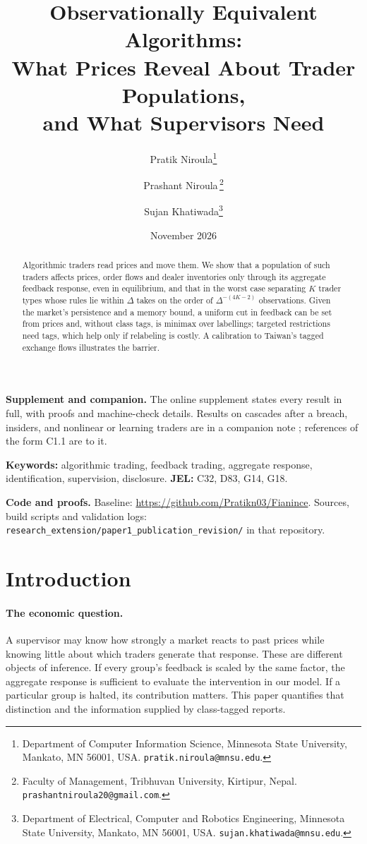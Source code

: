 \documentclass[12pt]{article}
\title{Observationally Equivalent Algorithms:\\ What Prices Reveal About Trader Populations,\\ and What Supervisors Need}
\author{Pratik Niroula\thanks{Department of Computer Information Science, Minnesota State University, Mankato, MN 56001, USA. \texttt{pratik.niroula@mnsu.edu}.}
\and Prashant Niroula\,\thanks{Faculty of Management, Tribhuvan University, Kirtipur, Nepal. \texttt{prashantniroula20@gmail.com}.}
\and Sujan Khatiwada\thanks{Department of Electrical, Computer and Robotics Engineering, Minnesota State University, Mankato, MN 56001, USA. \texttt{sujan.khatiwada@mnsu.edu}.}}
\date{November 2026}
\theoremstyle{definition}
\theoremstyle{remark}
\begin{document}
\maketitle
\thispagestyle{empty}\pagestyle{empty}
\begingroup\singlespacing\small

\begin{abstract}
\noindent Algorithmic traders read prices and move them. We show that a population of such traders affects prices, order flows and dealer inventories only through its aggregate feedback response, even in equilibrium, and that in the worst case separating $K$ trader types whose rules lie within $\Delta$ takes on the order of $\Delta^{-(4K-2)}$ observations. Given the market's persistence and a memory bound, a uniform cut in feedback can be set from prices and, without class tags, is minimax over labellings; targeted restrictions need tags, which help only if relabeling is costly. A calibration to Taiwan's tagged exchange flows illustrates the barrier.
\end{abstract}

\noindent\textbf{Supplement and companion.} The online supplement states every result in full, with proofs and machine-check details. Results on cascades after a breach, insiders, and nonlinear or learning traders are in a companion note \citep{niroula2026c}; references of the form C1.1 are to it.

\noindent\textbf{Keywords:} algorithmic trading, feedback trading, aggregate response, identification, supervision, disclosure. \textbf{JEL:} C32, D83, G14, G18.

\noindent\textbf{Code and proofs.} Baseline: \url{https://github.com/Pratikn03/Fianince}. Sources, build scripts and validation logs: \nolinkurl{research_extension/paper1_publication_revision/} in that repository.

\endgroup
\newpage
\pagestyle{fancy}
\setcounter{page}{1}

\section{Introduction}\label{n:intro}

\paragraph{The economic question.} A supervisor may know how strongly a market reacts to past prices while knowing little about which traders generate that response. These are different objects of inference. If every group's feedback is scaled by the same factor, the aggregate response is sufficient to evaluate the intervention in our model. If a particular group is halted, its contribution matters. This paper quantifies that distinction and the information supplied by class-tagged reports.
\end{document}
